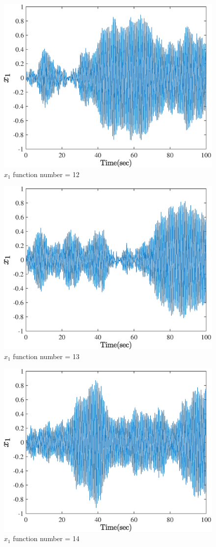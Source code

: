   \begin{figure}[H] 
  	\caption{$x_1$ function number = 12} 
  	\centering 
  	\includegraphics[width=12cm]{../Figure/Q5/part_a/12} 
  \end{figure}
  \begin{figure}[H] 
  	\caption{$x_1$ function number = 13} 
  	\centering 
  	\includegraphics[width=12cm]{../Figure/Q5/part_a/13} 
  \end{figure}
  \begin{figure}[H] 
  	\caption{$x_1$ function number = 14} 
  	\centering 
  	\includegraphics[width=12cm]{../Figure/Q5/part_a/14} 
  \end{figure}
